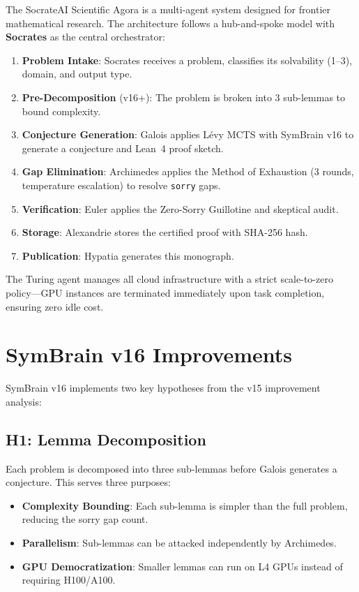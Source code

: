 \documentclass[12pt,a4paper]{report}
\theoremstyle{plain}
\theoremstyle{definition}
\theoremstyle{remark}
\newcommand{\sorry}{\textcolor{sorryred}{\texttt{sorry}}}
\begin{document}
The SocrateAI Scientific Agora is a multi-agent system designed for frontier
mathematical research. The architecture follows a hub-and-spoke model with
\textbf{Socrates} as the central orchestrator:

\begin{enumerate}
  \item \textbf{Problem Intake}: Socrates receives a problem, classifies its
    solvability (1--3), domain, and output type.
  \item \textbf{Pre-Decomposition} (v16+): The problem is broken into 3 sub-lemmas
    to bound complexity.
  \item \textbf{Conjecture Generation}: Galois applies Lévy MCTS with SymBrain v16
    to generate a conjecture and Lean~4 proof sketch.
  \item \textbf{Gap Elimination}: Archimedes applies the Method of Exhaustion
    (3 rounds, temperature escalation) to resolve \sorry{} gaps.
  \item \textbf{Verification}: Euler applies the Zero-Sorry Guillotine and
    skeptical audit.
  \item \textbf{Storage}: Alexandrie stores the certified proof with SHA-256 hash.
  \item \textbf{Publication}: Hypatia generates this monograph.
\end{enumerate}

The Turing agent manages all cloud infrastructure with a strict scale-to-zero
policy—GPU instances are terminated immediately upon task completion, ensuring
zero idle cost.

\chapter{SymBrain v16 Improvements}
\label{app:v16}

SymBrain v16 implements two key hypotheses from the v15 improvement analysis:

\section{H1: Lemma Decomposition}

Each problem is decomposed into three sub-lemmas before Galois generates a
conjecture. This serves three purposes:
\begin{itemize}
  \item \textbf{Complexity Bounding}: Each sub-lemma is simpler than the full
    problem, reducing the sorry gap count.
  \item \textbf{Parallelism}: Sub-lemmas can be attacked independently by
    Archimedes.
  \item \textbf{GPU Democratization}: Smaller lemmas can run on L4 GPUs instead
    of requiring H100/A100.
\end{itemize}
\end{document}

